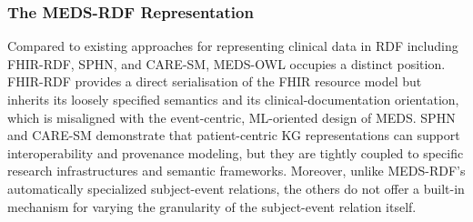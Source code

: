 




\subsubsection{The MEDS-RDF Representation} 
Compared to existing approaches for representing clinical data in RDF including FHIR-RDF, SPHN, and CARE-SM, MEDS-OWL occupies a distinct position. FHIR-RDF provides a direct serialisation of the FHIR resource model but inherits its loosely specified semantics and its clinical-documentation orientation, which is misaligned with the event-centric, ML-oriented design of MEDS. SPHN and CARE-SM demonstrate that patient-centric KG representations can support interoperability and provenance modeling, but they are tightly coupled to specific research infrastructures and semantic frameworks. Moreover, unlike MEDS-RDF's automatically specialized subject-event relations, the others do not offer a built-in mechanism for varying the granularity of the subject-event relation itself. %

